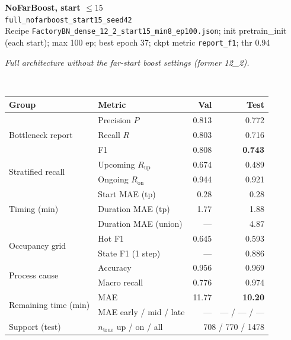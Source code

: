 \documentclass[9pt,a4paper,twocolumn]{extarticle}
\begin{document}
\noindent\begin{minipage}{\columnwidth}
\begin{center}
{\small\bfseries NoFarBoost, start $\le 15$}\\
{\scriptsize\texttt{full\_nofarboost\_start15\_seed42}}\\
{\scriptsize Recipe \texttt{FactoryBN\_dense\_12\_2\_start15\_min8\_ep100.json}; init pretrain\_init (each start); max 100 ep; best epoch 37; ckpt metric \texttt{report\_f1}; thr 0.94}\\[1pt]
\parbox{0.96\columnwidth}{\scriptsize\itshape Full architecture without the far-start boost settings (former 12\_2).}\\[2pt]
\scriptsize\setlength{\tabcolsep}{3pt}
\begin{tabular}{llrr}
\toprule
Group & Metric & Val & Test \\
\midrule
\multirow{3}{*}{Bottleneck report}
  & Precision $P$ & 0.813 & 0.772 \\
  & Recall $R$ & 0.803 & 0.716 \\
  & F1 & 0.808 & \textbf{0.743} \\
\midrule
\multirow{2}{*}{Stratified recall}
  & Upcoming $R_{\mathrm{up}}$ & 0.674 & 0.489 \\
  & Ongoing $R_{\mathrm{on}}$ & 0.944 & 0.921 \\
\midrule
\multirow{3}{*}{Timing (min)}
  & Start MAE (tp) & 0.28 & 0.28 \\
  & Duration MAE (tp) & 1.77 & 1.88 \\
  & Duration MAE (union) & --- & 4.87 \\
\midrule
\multirow{2}{*}{Occupancy grid}
  & Hot F1 & 0.645 & 0.593 \\
  & State F1 (1 step) & --- & 0.886 \\
\midrule
\multirow{2}{*}{Process cause}
  & Accuracy & 0.956 & 0.969 \\
  & Macro recall & 0.776 & 0.974 \\
\midrule
\multirow{2}{*}{Remaining time (min)}
  & MAE & 11.77 & \textbf{10.20} \\
  & MAE early / mid / late & --- & --- / --- / --- \\
\midrule
Support (test)
  & $n_{\mathrm{true}}$ up / on / all & \multicolumn{2}{r}{708 / 770 / 1478} \\
\bottomrule
\end{tabular}
\end{center}
\end{minipage}\par\vspace{6pt}
\end{document}
